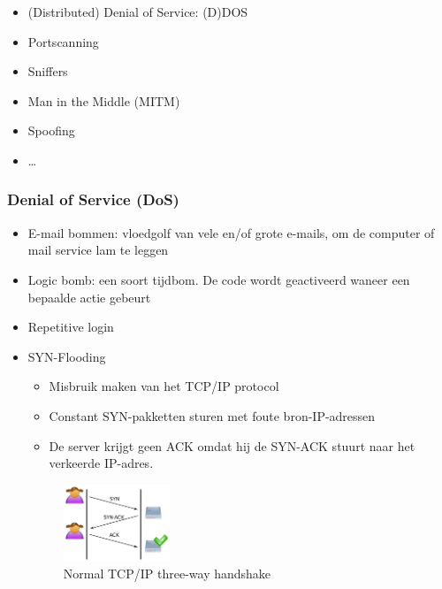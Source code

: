 \documentclass{article}
\begin{document}
\begin{itemize}
    \item (Distributed) Denial of Service: (D)DOS
    \item Portscanning
    \item Sniffers
    \item Man in the Middle (MITM)
    \item Spoofing
    \item \dots
\end{itemize}

\subsubsection{Denial of Service (DoS)}
\begin{itemize}
    \item E-mail bommen: vloedgolf van vele en/of grote e-mails, om de computer of mail service lam te leggen
    \item Logic bomb: een soort tijdbom. De code wordt geactiveerd waneer een bepaalde actie gebeurt
    \item Repetitive login
    \item SYN-Flooding
    \begin{itemize}
        \item Misbruik maken van het TCP/IP protocol
        \item Constant SYN-pakketten sturen met foute bron-IP-adressen
        \item De server krijgt geen ACK omdat hij de SYN-ACK stuurt naar het verkeerde IP-adres.
    \end{itemize}
\begin{figure}[H]
    \centering
    \includegraphics[width=0.3\textwidth]{tcp-normal.png}
    \caption{Normal TCP/IP three-way handshake}
\end{figure}


\end{itemize}
\end{document}
